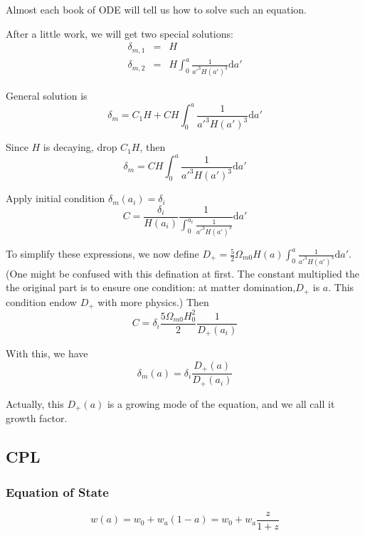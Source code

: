 \documentclass{article}
\begin{document}
Almost each book of ODE will tell us how to solve such an equation.

After a little work, we will get two special solutions:
\begin{eqnarray}
\delta_{m,1}&=&H \\
\delta_{m,2}&=&H\int^a_0 \frac1{a'^3H(a')^3}\mathrm d a'
\end{eqnarray}

General solution is
\begin{equation}
\delta_m=C_1 H+C H\int^a_0 \frac{1}{a'^3H(a')^3}\mathrm da'
\end{equation}

Since $H$ is decaying, drop $C_1 H$, then
\begin{equation}
\delta_m=C H\int^a_0 \frac{1}{a'^3H(a')^3}\mathrm da'
\end{equation}

Apply initial condition $\delta_m(a_{i})=\delta_{i}$
\begin{equation}
C=\frac{\delta_i}{H(a_i)}\frac{1}{\int^{a_i}_0\frac{1}{a'^3H(a')^3}}\mathrm d a'
\end{equation}

To simplify these expressions, we now define $D_+=\frac 5 2 \Omega_{m0} H(a) \int^a_0\frac{1}{a'^3H(a')^3}\mathrm d a'$. (One might be confused with this defination at first. The constant multiplied the the original part is to ensure one condition: at matter domination,$D_+$ is $a$. This condition endow $D_+$ with more physics.) Then 
\begin{equation}
C=\delta_i \frac {5\Omega_{m0}H_0^2}{2} \frac1{D_+(a_i)}
\end{equation}

With this, we have
\begin{equation}
\delta_m(a)=\delta_i \frac{D_+(a)}{D_+(a_i)}
\end{equation}

Actually, this $D_+(a)$ is a growing mode of the equation, and we all call it growth factor.




\subsection{CPL}

\subsubsection{Equation of State}

\begin{equation}
w(a)=w_0+w_a(1-a)=w_0+w_a\frac{z}{1+z}
\end{equation}
\end{document}
